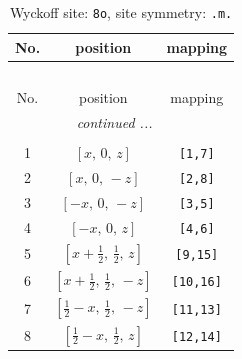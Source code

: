 \documentclass[fleqn,8pt]{jsarticle}
\begin{document}
\begin{longtable}{ccc}
\caption{Wyckoff site: {\tt 8o}, site symmetry: {\tt .m.}}
 \\
 \hline \hline
No. & position & mapping \\ \hline \endfirsthead

\multicolumn{2}{l}{\tablename\ \thetable{}} \\
 \hline \hline
No. & position & mapping \\ \hline \endhead

 \hline \hline
\multicolumn{2}{r}{\footnotesize\it continued ...} \\ \endfoot

 \hline \hline
\multicolumn{2}{r}{} \\ \endlastfoot

1 & $\left[ x,\, 0,\, z \right]$ & {\tt [1,7]} \\ \hline
2 & $\left[ x,\, 0,\, - z \right]$ & {\tt [2,8]} \\ \hline
3 & $\left[ - x,\, 0,\, - z \right]$ & {\tt [3,5]} \\ \hline
4 & $\left[ - x,\, 0,\, z \right]$ & {\tt [4,6]} \\ \hline
5 & $\left[ x + \frac{1}{2},\, \frac{1}{2},\, z \right]$ & {\tt [9,15]} \\ \hline
6 & $\left[ x + \frac{1}{2},\, \frac{1}{2},\, - z \right]$ & {\tt [10,16]} \\ \hline
7 & $\left[ \frac{1}{2} - x,\, \frac{1}{2},\, - z \right]$ & {\tt [11,13]} \\ \hline
8 & $\left[ \frac{1}{2} - x,\, \frac{1}{2},\, z \right]$ & {\tt [12,14]} \\
\end{longtable}
\renewcommand{\arraystretch}{1.2}
\end{document}
